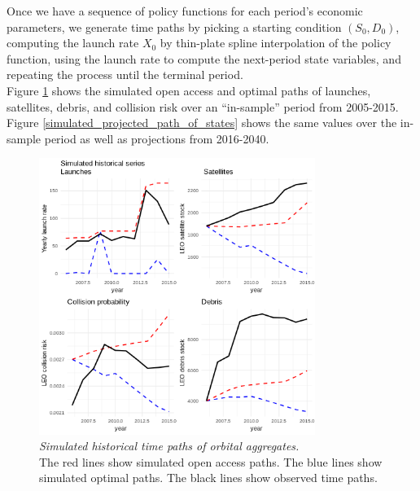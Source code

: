 \documentclass[12pt]{article}
\begin{document}
Once we have a sequence of policy functions for each period's economic parameters, we generate time paths by picking a starting condition $(S_0,D_0)$, computing the launch rate $X_0$ by thin-plate spline interpolation of the policy function, using the launch rate to compute the next-period state variables, and repeating the process until the terminal period. \\

Figure \ref{simulated_historical_path_of_states} shows the simulated open access and optimal paths of launches, satellites, debris, and collision risk over an ``in-sample'' period from 2005-2015. Figure \ref{simulated_projected_path_of_states} shows the same values over the in-sample period as well as projections from 2016-2040. 

\begin{figure}[H]
	\centering
	\includegraphics[width=0.8\textwidth]{../../images/simulated_historical_series.png}
	\captionsetup{format=hang}
	\caption[Simulated historical time paths of orbital aggregates]{\textit{Simulated historical time paths of orbital aggregates.} \\
		The red lines show simulated open access paths. The blue lines show simulated optimal paths. The black lines show observed time paths.
	}
	\label{simulated_historical_path_of_states}
\end{figure}
\end{document}
